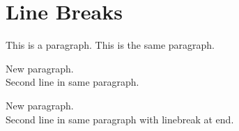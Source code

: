 
\def\mytitle{Line Break Test}

\part{Line Breaks}
\label{linebreaks}

This is a paragraph.
This is the same paragraph.

New paragraph.\\
Second line in same paragraph.

New paragraph.\\
Second line in same paragraph with linebreak at end. 




